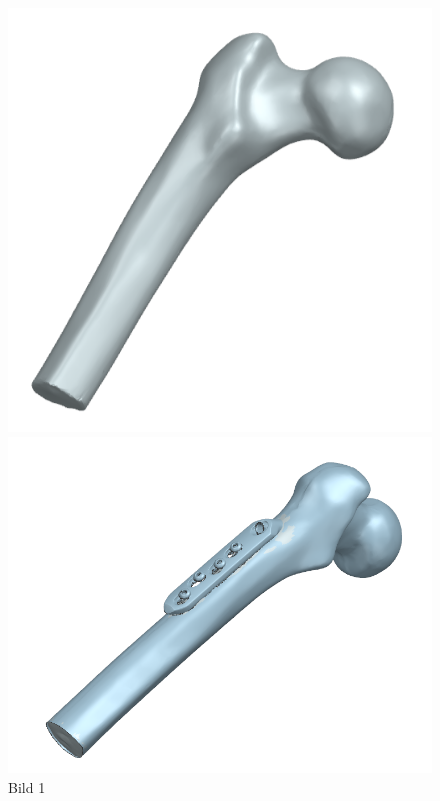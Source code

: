 \begin{figure}[H]
    \centering
    \begin{minipage}[b]{0.3\textwidth}
        \centering
        \includegraphics[width=\textwidth]{abb1/Femur_oben_GOM.png}
        \caption{Bild 1}
    \end{minipage}
    \hfill
    \begin{minipage}[b]{0.3\textwidth}
        \centering
        \includegraphics[width=\textwidth]{abb1/Impl_2_3D_Scan.png}

\end{minipage}
\end{figure}
